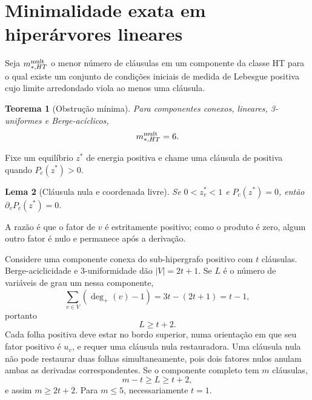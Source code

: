 \documentclass[11pt,a4paper]{article}
\newtheorem{theorem}{Teorema}[section]
\newtheorem{lemma}[theorem]{Lema}
\begin{document}
\section{Minimalidade exata em hiperárvores lineares}
Seja $m_{*,HT}^{\rm mult}$ o menor número de cláusulas em um componente da classe HT para o qual existe um conjunto de condições iniciais de medida de Lebesgue positiva cujo limite arredondado viola ao menos uma cláusula.

\begin{theorem}[Obstrução mínima]
Para componentes conexos, lineares, 3-uniformes e Berge-acíclicos,
\[
m_{*,HT}^{\rm mult}=6.
\]
\end{theorem}

Fixe um equilíbrio $z^*$ de energia positiva e chame uma cláusula de positiva quando $P_c(z^*)>0$.

\begin{lemma}[Cláusula nula e coordenada livre]
Se $0<z_v^*<1$ e $P_c(z^*)=0$, então $\partial_vP_c(z^*)=0$.
\end{lemma}
\noindent A razão é que o fator de $v$ é estritamente positivo; como o produto é zero, algum outro fator é nulo e permanece após a derivação.

Considere uma componente conexa do sub-hipergrafo positivo com $t$ cláusulas. Berge-aciclicidade e 3-uniformidade dão $|V|=2t+1$. Se $L$ é o número de variáveis de grau um nessa componente,
\[
\sum_{v\in V}(\deg_+(v)-1)=3t-(2t+1)=t-1,
\]
portanto
\begin{equation}
L\ge t+2.
\end{equation}
Cada folha positiva deve estar no bordo superior, numa orientação em que seu fator positivo é $u_v$, e requer uma cláusula nula restauradora. Uma cláusula nula não pode restaurar duas folhas simultaneamente, pois dois fatores nulos anulam ambas as derivadas correspondentes. Se o componente completo tem $m$ cláusulas,
\[
m-t\ge L\ge t+2,
\]
e assim $m\ge2t+2$. Para $m\le5$, necessariamente $t=1$.
\end{document}
